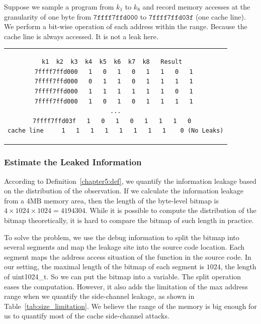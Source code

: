 \begin{myexample}
Suppose we sample a program from $k_1$ to $k_8$ and record memory accesses at the granularity of one byte from $\mathtt{7ffff7ffd000}$ to $\mathtt{7ffff7ffd03f}$ (one cache line). We perform a bit-wise operation of each address within the range. Because the cache line is always accessed. It is not a leak here.
\begin{center}
  \begin{tabular}{c}
    {
      \begin{lstlisting}[frame=none,numbers=none]
              k1  k2  k3  k4  k5  k6  k7  k8   Result  
7ffff7ffd000   1   0   1   0   1   1   0   1 
7ffff7ffd000   0   1   1   0   1   1   1   1 
7ffff7ffd000   1   1   1   1   1   1   0   1 
7ffff7ffd000   1   0   1   0   1   1   1   1 
...
7ffff7ffd03f   1   0   1   0   1   1   1   0  
cache line     1   1   1   1   1   1   1   1    0 (No Leaks)
\end{lstlisting}
    }
  \end{tabular}
\end{center}
\end{myexample}

\subsubsection{Estimate the Leaked Information}
According to Definition~\ref{chapter5:def}, we quantify the information leakage based on the distribution of the observation. If we calculate the information leakage from a $4 \mathrm{MB}$ memory area, then the length of the byte-level bitmap is $4 \times 1024 \times 1024 = 4194304$. While it is possible to compute the distribution of the bitmap theoretically, it is hard to compare the bitmap of such length in practice.

To solve the problem, we use the debug information to split the bitmap into several segments and map the leakage site into the source code location. Each segment maps the address access situation of the function in the source code. In our setting, the maximal length of the bitmap of each segment is $1024$, the length of \textsf{uint1024\_t}. So we can put the bitmap into a variable. The split operation eases the computation. However, it also adds the limitation of the max address range when we quantify the side-channel leakage, as shown in Table~\ref{tab:size_limitation}. We believe the range of the memory is big enough for us to quantify most of the cache side-channel attacks.

